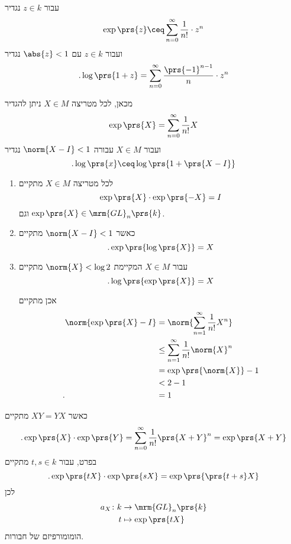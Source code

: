 \documentclass[10pt, twoside]{book}
\begin{document}
\begin{definition}
עבור
$z \in k$
נגדיר
\[\exp\prs{z} \ceq \sum_{n = 0}^{\infty} \frac{1}{n!} \cdot z^n\]
ועבור
$z \in k$
עם
$\abs{z} < 1$
נגדיר
\[\text{.} \log\prs{1+z} = \sum_{n=0}^{\infty} \frac{\prs{-1}^{n-1}}{n} \cdot z^n\]

מכאן, לכל מטריצה
$X \in M$
ניתן להגדיר
\[\exp\prs{X} = \sum_{n=0}^{\infty} \frac{1}{n!} X\]
ועבור
$X \in M$
עבורה
$\norm{X - I} < 1$
נגדיר
\[\text{.} \log\prs{x} \ceq \log\prs{1+\prs{X-I}}\]
\end{definition}

\begin{corollary}
\begin{enumerate}
\item לכל מטריצה
$X \in M$
מתקיים
\[\exp\prs{X} \cdot \exp\prs{-X} = I\]
וגם
$\exp\prs{X} \in \mrm{GL}_n\prs{k}$.

\item כאשר
$\norm{X - I} < 1$
מתקיים
\[\text{.} \exp\prs{\log\prs{X}} = X\]

\item עבור
$X \in M$
המקיימת
$\norm{X} < \log 2$
מתקיים
\[\text{.} \log\prs{\exp\prs{X}} = X\]

אכן
מתקיים
\begin{align*}
\norm{\exp\prs{X} - I} &= \norm{\sum_{n=1}^{\infty} \frac{1}{n!} X^n}
\\&\leq
\sum_{n=1}^{\infty} \frac{1}{n!} \norm{X}^n
\\&= \exp\prs{\norm{X}} - 1
\\&< 2 - 1
\\\text{.} \hphantom{\norm{\exp\prs{X} - I}} &= 1
\end{align*}
\end{enumerate}
\end{corollary}

\begin{exercise}
כאשר
$XY = YX$
מתקיים
\begin{align*}
\text{.} \exp\prs{X} \cdot \exp\prs{Y} = \sum_{n=0}^{\infty} \frac{1}{n!} \prs{X+Y}^n = \exp\prs{X+Y}
\end{align*}
בפרט, עבור
$t,s \in k$
מתקיים
\[\text{.} \exp\prs{tX} \cdot \exp\prs{sX} = \exp\prs{\prs{t+s}X}\]
לכן
\begin{align*}
a_X \colon k &\to \mrm{GL}_n\prs{k} \\
t &\mapsto \exp\prs{tX}
\end{align*}
הומומורפיזם של חבורות.
\end{exercise}
\end{document}
